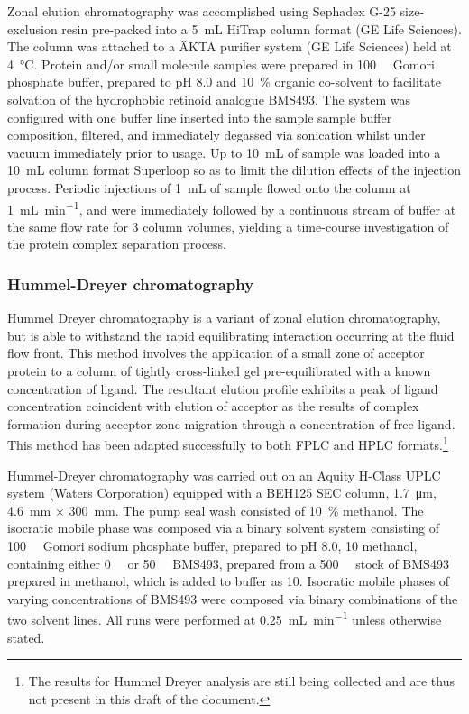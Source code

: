 \begin{refsection}
Zonal elution chromatography was accomplished using Sephadex G-25 size-exclusion
resin pre-packed into a \SI{5}{\mL} HiTrap column format (GE Life Sciences). The
column was attached to a \"{A}KTA purifier system (GE Life Sciences) held at
\SI{4}{\celsius}. Protein and/or small molecule samples were prepared in
\SI{100}{\milli\moLar} Gomori phosphate buffer, prepared to pH 8.0 and
\SI{10}{\percent} organic co-solvent to facilitate solvation of the hydrophobic
retinoid analogue BMS493. The system was configured with one buffer line inserted into
the sample sample buffer composition, filtered, and immediately degassed via
sonication whilst under vacuum immediately prior to usage. Up to \SI{10}{\mL} of
sample was loaded into a \SI{10}{\mL} column format Superloop so as to limit the
dilution effects of the injection process. Periodic injections of \SI{1}{\mL} of
sample flowed onto the column at \SI{1}{\mL\per\minute}, and were immediately
followed by a continuous stream of buffer at the same flow rate for 3 column
volumes, yielding a time-course investigation of the protein
complex separation process.

\subsubsection{Hummel-Dreyer chromatography}
Hummel Dreyer chromatography is a variant of zonal elution chromatography, but
is able to withstand the rapid equilibrating interaction occurring at the fluid
flow front. This method involves the application of a small zone of acceptor
protein to a column of tightly cross-linked gel pre-equilibrated with a known
concentration of ligand.\cite{Hummel1962} The resultant elution profile exhibits
a peak of ligand concentration coincident with elution of acceptor as the
results of complex formation during acceptor zone migration through a
concentration of free ligand.  This method has been adapted successfully to both
FPLC and HPLC formats.\cite{Bieri1998}\footnote{The results for Hummel Dreyer
    analysis are still being collected and are thus not present in this draft of
the document.}

Hummel-Dreyer chromatography was carried out on an Aquity H-Class UPLC system
(Waters Corporation) equipped with a BEH125 SEC column, \SI{1.7}{\um},
\SI{4.6}{\mm} ${\times}$ \SI{300}{\mm}. The pump seal wash consisted of
\SI{10}{\percent} methanol. The isocratic mobile phase was composed via a
binary solvent system consisting of \SI{100}{\milli\moLar} Gomori sodium
phosphate buffer, prepared to pH 8.0, \SI{10}{\volper} methanol, containing
either \SI{0}{\micro\moLar} or \SI{50}{\micro\moLar} BMS493, prepared from a
\SI{500}{\micro\moLar} stock of BMS493 prepared in methanol, which is added to
buffer as \SI{10}{\volper}. Isocratic mobile phases of varying concentrations of
BMS493 were composed via binary combinations of the two solvent lines. All runs
were performed at \SI{0.25}{\mL\per\minute} unless otherwise stated.


\end{refsection}
